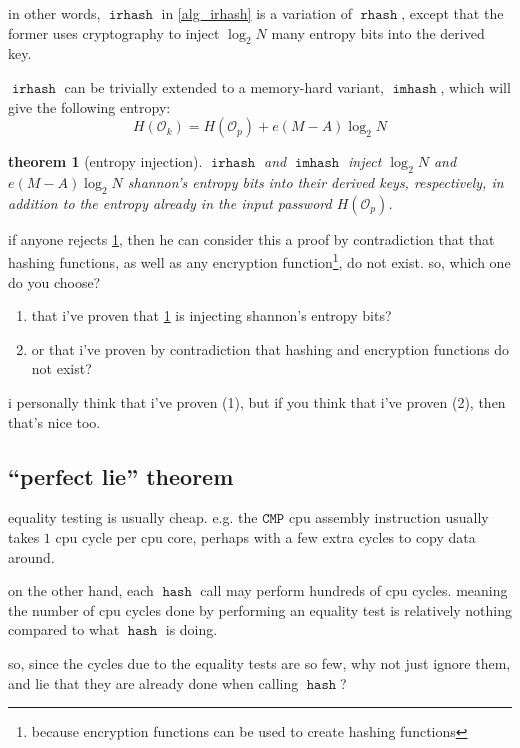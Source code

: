 \documentclass[twocolumn]{article}
\newtheorem{theorem}{theorem}[section]
\DeclareMathOperator{\hash}{\mathtt{hash}}
\DeclareMathOperator{\rhash}{\mathtt{rhash}}
\DeclareMathOperator{\irhash}{\mathtt{irhash}}
\DeclareMathOperator{\imhash}{\mathtt{imhash}}
\begin{document}
in other words, $\irhash$ in \cref{alg_irhash} is a variation of $\rhash$,
except that the former uses cryptography to inject $\log_2 N$ many entropy
bits into the derived key.

$\irhash$ can be trivially extended to a memory-hard variant, $\imhash$,
which will give the following entropy:
\begin{equation}
    H(\mathcal{O}_k) = H(\mathcal{O}_p) + e(M-A)\log_2 N
\end{equation}

\begin{theorem}[entropy injection]\label{theorem_entropy_injection}
    $\irhash$ and $\imhash$ inject $\log_2 N$ and $e(M-A)\log_2 N$
    shannon's entropy bits into their derived keys, respectively, in
    addition to the entropy already in the input password
    $H(\mathcal{O}_p)$.
\end{theorem}

if anyone rejects \cref{theorem_entropy_injection}, then he can consider
this a proof by contradiction that that hashing functions, as well as any
encryption function\footnote{because encryption functions can be used to
create hashing functions}, do not exist.  so, which one do you choose?  
\begin{enumerate}
    \item that i've proven that \cref{theorem_entropy_injection} is
    injecting shannon's entropy bits?

    \item or that i've proven by contradiction that hashing and encryption
    functions do not exist?
\end{enumerate}

i personally think that i've proven (1), but if you think that i've proven
(2), then that's nice too.

\subsection{``perfect lie'' theorem}
equality testing is usually cheap.  e.g. the $\texttt{CMP}$ cpu assembly
instruction usually takes $1$ cpu cycle per cpu core, perhaps with a few
extra cycles to copy data around.  

on the other hand, each $\hash$ call may perform hundreds of cpu cycles.
meaning the number of cpu cycles done by performing an equality test is
relatively nothing compared to what $\hash$ is doing.

so, since the cycles due to the equality tests are so few, why not just
ignore them, and lie that they are already done when calling $\hash$?
\end{document}
